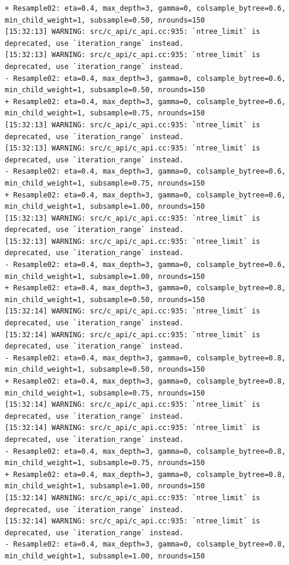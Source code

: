 \documentclass[
  letterpaper,
  DIV=11,
  numbers=noendperiod]{scrartcl}
\begin{document}
\begin{verbatim}
+ Resample02: eta=0.4, max_depth=3, gamma=0, colsample_bytree=0.6, min_child_weight=1, subsample=0.50, nrounds=150 
[15:32:13] WARNING: src/c_api/c_api.cc:935: `ntree_limit` is deprecated, use `iteration_range` instead.
[15:32:13] WARNING: src/c_api/c_api.cc:935: `ntree_limit` is deprecated, use `iteration_range` instead.
- Resample02: eta=0.4, max_depth=3, gamma=0, colsample_bytree=0.6, min_child_weight=1, subsample=0.50, nrounds=150 
+ Resample02: eta=0.4, max_depth=3, gamma=0, colsample_bytree=0.6, min_child_weight=1, subsample=0.75, nrounds=150 
[15:32:13] WARNING: src/c_api/c_api.cc:935: `ntree_limit` is deprecated, use `iteration_range` instead.
[15:32:13] WARNING: src/c_api/c_api.cc:935: `ntree_limit` is deprecated, use `iteration_range` instead.
- Resample02: eta=0.4, max_depth=3, gamma=0, colsample_bytree=0.6, min_child_weight=1, subsample=0.75, nrounds=150 
+ Resample02: eta=0.4, max_depth=3, gamma=0, colsample_bytree=0.6, min_child_weight=1, subsample=1.00, nrounds=150 
[15:32:13] WARNING: src/c_api/c_api.cc:935: `ntree_limit` is deprecated, use `iteration_range` instead.
[15:32:13] WARNING: src/c_api/c_api.cc:935: `ntree_limit` is deprecated, use `iteration_range` instead.
- Resample02: eta=0.4, max_depth=3, gamma=0, colsample_bytree=0.6, min_child_weight=1, subsample=1.00, nrounds=150 
+ Resample02: eta=0.4, max_depth=3, gamma=0, colsample_bytree=0.8, min_child_weight=1, subsample=0.50, nrounds=150 
[15:32:14] WARNING: src/c_api/c_api.cc:935: `ntree_limit` is deprecated, use `iteration_range` instead.
[15:32:14] WARNING: src/c_api/c_api.cc:935: `ntree_limit` is deprecated, use `iteration_range` instead.
- Resample02: eta=0.4, max_depth=3, gamma=0, colsample_bytree=0.8, min_child_weight=1, subsample=0.50, nrounds=150 
+ Resample02: eta=0.4, max_depth=3, gamma=0, colsample_bytree=0.8, min_child_weight=1, subsample=0.75, nrounds=150 
[15:32:14] WARNING: src/c_api/c_api.cc:935: `ntree_limit` is deprecated, use `iteration_range` instead.
[15:32:14] WARNING: src/c_api/c_api.cc:935: `ntree_limit` is deprecated, use `iteration_range` instead.
- Resample02: eta=0.4, max_depth=3, gamma=0, colsample_bytree=0.8, min_child_weight=1, subsample=0.75, nrounds=150 
+ Resample02: eta=0.4, max_depth=3, gamma=0, colsample_bytree=0.8, min_child_weight=1, subsample=1.00, nrounds=150 
[15:32:14] WARNING: src/c_api/c_api.cc:935: `ntree_limit` is deprecated, use `iteration_range` instead.
[15:32:14] WARNING: src/c_api/c_api.cc:935: `ntree_limit` is deprecated, use `iteration_range` instead.
- Resample02: eta=0.4, max_depth=3, gamma=0, colsample_bytree=0.8, min_child_weight=1, subsample=1.00, nrounds=150 

\end{verbatim}
\end{document}
